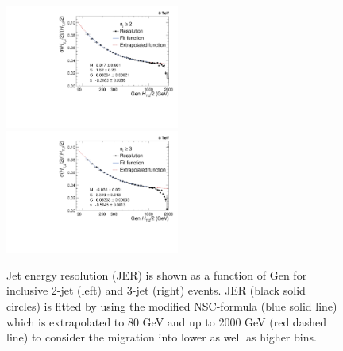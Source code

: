 \begin{figure}[!h]
 \begin{center}
 \hspace*{-5mm}\includegraphics[width=0.51\textwidth]{Plots_HT_2_150/Extrapolate_Sigma_Value_Res_2_crystal_range_ext.pdf}%
 ~~\includegraphics[width=0.51\textwidth]{Plots_HT_2_150/Extrapolate_Sigma_Value_Res_3_crystal_ext.pdf}
 \caption[Jet energy resolution (JER) is shown as a function of Gen \httwo.]{Jet energy resolution (JER) is shown as a function of Gen \httwo for inclusive 2-jet (left) and 3-jet (right) events. JER (black solid circles) is fitted by using the modified NSC-formula (blue solid line) which is extrapolated to 80 GeV and up to 2000 GeV (red dashed line) to consider the migration into lower as well as higher bins.}
 \label{fig:resolution}
 \end{center}
\end{figure}
 
